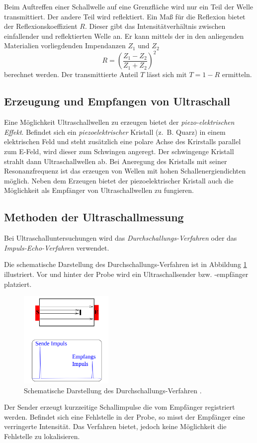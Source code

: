 Beim Auftreffen einer Schallwelle auf eine Grenzfläche wird nur ein Teil der
Welle transmittiert. Der andere Teil wird reflektiert.
Ein Maß für die Reflexion bietet der Reflexionskoeffizient $R$.
Dieser gibt das Intensitätverhältnis zwischen einfallender und reflektierten Welle an.
Er kann mittels der in den anliegenden Materialien vorliegdenden Impendanzen $Z_1$ und $Z_2$
\begin{equation*}
  R=\left(\frac{Z_1-Z_2}{Z_1+Z_2}\right)^2
\end{equation*}
berechnet werden.
Der transmittierte Anteil $T$ lässt sich mit $T=1-R$ ermitteln.

\subsection{Erzeugung und Empfangen von Ultraschall}

Eine Möglichkeit Ultraschallwellen zu erzeugen bietet der \emph{piezo-elektrischen Effekt}.
Befindet sich ein \emph{piezoelektrischer} Kristall (z.\, B. Quarz) in einem elektrischen Feld und steht
zusätzlich eine polare Achse des Krirstalls parallel zum E-Feld, wird dieser
zum Schwingen angeregt. Der schwingenge Kristall strahlt dann Ultraschallwellen ab.
Bei Aneregung des Kristalls mit seiner Resonanzfrequenz ist das erzeugen von Wellen mit hohen
Schallenergiendichten möglich.
Neben dem Erzeugen bietet der piezoelektrischer Kristall auch die Möglichkeit
als Empfänger von Ultraschallwellen zu fungieren.

\subsection{Methoden der Ultraschallmessung}
Bei Ultraschalluntersuchungen wird das \emph{Durchschallungs-Verfahren} oder
das \emph{Impuls-Echo-Verfahren} verwendet.

Die schematische Darstellung des Durchschallungs-Verfahren ist in Abbildung
\ref{fig: durch} illustriert. Vor und hinter der Probe wird ein Ultraschallsender bzw. -empfänger
platziert.
\begin{figure}[h]
  \centering
  \includegraphics[width=0.4\textwidth]{pics/durchsall.png}
  \caption{Schematische Darstellung des Durchschallungs-Verfahren \cite{anleitungus1}.}
  \label{fig: durch}
  \end{figure}
Der Sender erzeugt kurzzeitige Schallimpulse die vom Empfänger
registriert werden. Befindet sich eine Fehlstelle in der Probe, so misst der Empfänger
eine verringerte Intensität.
Das Verfahren bietet, jedoch keine Möglichkeit die Fehlstelle zu lokalisieren.

